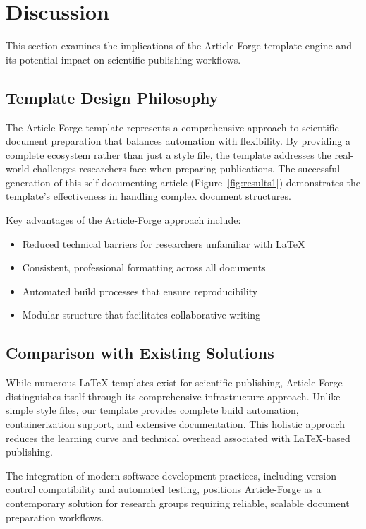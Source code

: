 \section{Discussion}

This section examines the implications of the Article-Forge template engine and its potential impact on scientific publishing workflows.

\subsection{Template Design Philosophy}

The Article-Forge template represents a comprehensive approach to scientific document preparation that balances automation with flexibility. By providing a complete ecosystem rather than just a style file, the template addresses the real-world challenges researchers face when preparing publications. The successful generation of this self-documenting article (Figure~\ref{fig:results1}) demonstrates the template's effectiveness in handling complex document structures.

Key advantages of the Article-Forge approach include:
\begin{itemize}
    \item Reduced technical barriers for researchers unfamiliar with LaTeX
    \item Consistent, professional formatting across all documents
    \item Automated build processes that ensure reproducibility
    \item Modular structure that facilitates collaborative writing
\end{itemize}

\subsection{Comparison with Existing Solutions}

While numerous LaTeX templates exist for scientific publishing, Article-Forge distinguishes itself through its comprehensive infrastructure approach. Unlike simple style files, our template provides complete build automation, containerization support, and extensive documentation. This holistic approach reduces the learning curve and technical overhead associated with LaTeX-based publishing.

The integration of modern software development practices, including version control compatibility and automated testing, positions Article-Forge as a contemporary solution for research groups requiring reliable, scalable document preparation workflows.

